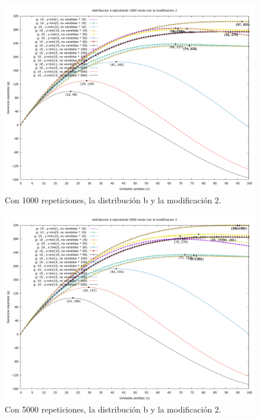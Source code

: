 \documentclass[12pt, spanish]{article}
\begin{document}
\begin{figure}[H]
	\centering
	\includegraphics[scale = 0.2]{prob_b/datos_b_1000_2.png}
	\caption{Con 1000 repeticiones, la distribución b y la modificación 2.}
	\label{fig:ej1_a_1000}

\end{figure}

\begin{figure}[H]
	\centering
	\includegraphics[scale = 0.2]{prob_b/datos_b_5000_2.png}
	\caption{Con 5000 repeticiones, la distribución b y la modificación 2.}
	\label{fig:ej1_a_5000}

\end{figure}
\end{document}
